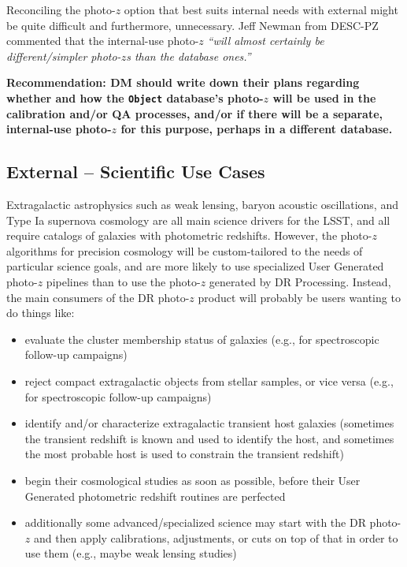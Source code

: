 \documentclass[DM,lsstdraft,toc]{lsstdoc}
\begin{document}
Reconciling the photo-$z$ option that best suits internal needs with external might be quite difficult and furthermore, unnecessary. Jeff Newman from DESC-PZ commented that the internal-use photo-$z$ \textit{``will almost certainly be different/simpler photo-$z$s than the database ones.''}

\textbf{Recommendation: DM should write down their plans regarding whether and how the \texttt{Object} database's photo-$z$ will be used in the calibration and/or QA processes, and/or if there will be a separate, internal-use photo-$z$ for this purpose, perhaps in a different database.}

\subsection{External -- Scientific Use Cases}\label{ssec:motivation_external}

Extragalactic astrophysics such as weak lensing, baryon acoustic oscillations, and Type Ia supernova cosmology are all main science drivers for the LSST, and all require catalogs of galaxies with photometric redshifts. However, the photo-$z$ algorithms for precision cosmology will be custom-tailored to the needs of particular science goals, and are more likely to use specialized User Generated photo-$z$ pipelines than to use the photo-$z$ generated by DR Processing. Instead, the main consumers of the DR photo-$z$ product will probably be users wanting to do things like:
\begin{itemize}
\item evaluate the cluster membership status of galaxies (e.g., for spectroscopic follow-up campaigns)
\item reject compact extragalactic objects from stellar samples, or vice versa (e.g., for spectroscopic follow-up campaigns)
\item identify and/or characterize extragalactic transient host galaxies (sometimes the transient redshift is known and used to identify the host, and sometimes the most probable host is used to constrain the transient redshift)
\item begin their cosmological studies as soon as possible, before their User Generated photometric redshift routines are perfected
\item additionally some advanced/specialized science may start with the DR photo-$z$ and then apply calibrations, adjustments, or cuts on top of that in order to use them (e.g., maybe weak lensing studies)
\end{itemize}
\end{document}
